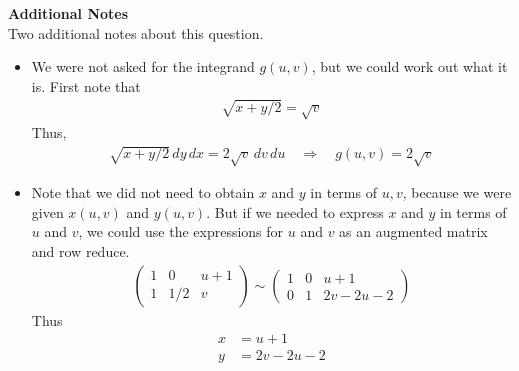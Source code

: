 {    \textbf{Additional Notes}\\
    Two additional notes about this question. 
    \begin{itemize}
        \item We were not asked for the integrand $g(u,v)$, but we could work out what it is. First note that 
    \begin{align}
        \sqrt{x+y/2} =  \sqrt v
    \end{align}    
    Thus,
    \begin{align}
        \sqrt{x+y/2} \, dy\,dx = 2\sqrt{v} \,dv \, du \quad \Rightarrow \quad g(u,v) = 2 \sqrt v
    \end{align}
        \item Note that we did not need to obtain $x$ and $y$ in terms of $u,v$, because we were given $x(u,v)$ and $y(u,v)$. But if we needed to express $x$ and $y$ in terms of $u$ and $v$, we could use the expressions for $u$ and $v$ as an augmented matrix and row reduce. 
    \begin{align}
        \begin{pmatrix} 1 & 0 & u+1 \\1 & 1/2 & v\end{pmatrix} 
        \sim \begin{pmatrix} 1 & 0 & u+1 \\0 & 1 & 2v-2u-2\end{pmatrix} 
    \end{align}
    Thus
    \begin{align}
        x &= u+1 \\
        y &= 2v-2u-2
    \end{align}
    
    \end{itemize}
    
    
    }
   \else

   \fi
\fi 

\ifnum {}
